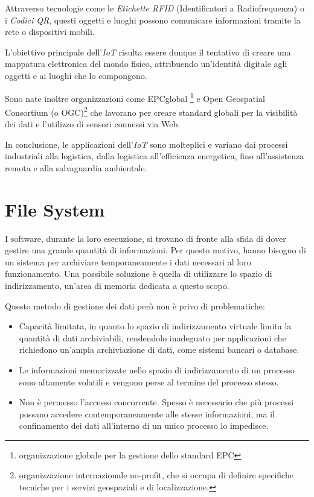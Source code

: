 \documentclass[12pt,a4paper,openright,twoside]{book}
\begin{document}
        Attraverso tecnologie come le \textit{Etichette RFID} (Identificatori a Radiofrequenza) o i \textit{Codici QR}, questi oggetti e luoghi possono comunicare informazioni tramite la rete o dispositivi mobili.

        L'obiettivo principale dell’\textit{IoT} risulta essere dunque il tentativo di creare una mappatura elettronica del mondo fisico, attribuendo un’identità digitale agli oggetti e ai luoghi che lo compongono.

        Sono nate inoltre organizzazioni come EPCglobal \footnote{ organizzazione globale per la gestione dello standard EPC} e Open Geospatial Consortium (o OGC)\footnote{organizzazione internazionale no-profit, che si occupa di definire specifiche tecniche per i servizi geospaziali e di localizzazione.} che lavorano per creare standard globali per la visibilità dei dati e l’utilizzo di sensori connessi via Web.

        In conclusione, le applicazioni dell’\textit{IoT} sono molteplici e variano dai processi industriali alla logistica, dalla logistica all’efficienza energetica, fino all’assistenza remota e alla salvaguardia ambientale.

        \cite{uckelmann2011architecting}\cite{hersent2011internet}\cite{chaouchi2013internet}

    \section{File System}

        I software, durante la loro esecuzione, si trovano di fronte alla sfida di dover gestire una grande quantità di informazioni. Per questo motivo, hanno bisogno di un sistema per archiviare temporaneamente i dati necessari al loro funzionamento. Una possibile soluzione è quella di utilizzare lo spazio di indirizzamento, un'area di memoria dedicata a questo scopo.

        \pagebreak

        Questo metodo di gestione dei dati però non è privo di problematiche:

        \begin{itemize}
            \item Capacità limitata, in quanto lo spazio di indirizzamento virtuale limita la quantità di dati archiviabili, rendendolo inadeguato per applicazioni che richiedono un'ampia archiviazione di dati, come sistemi bancari o database.
            \item Le informazioni memorizzate nello spazio di indirizzamento di un processo sono altamente volatili e vengono perse al termine del processo stesso.
            \item Non è permesso l'accesso concorrente. Spesso è necessario che più processi possano accedere contemporaneamente alle stesse informazioni, ma il confinamento dei dati all'interno di un unico processo lo impedisce.
        \end{itemize}
\end{document}
